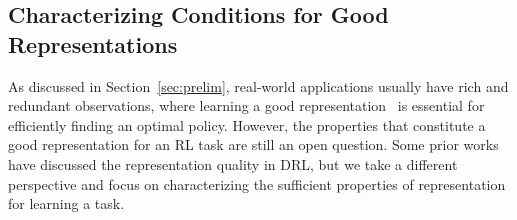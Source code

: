 
\subsection{Characterizing Conditions for Good Representations}
\label{sec:representation} 

As discussed in Section~\ref{sec:prelim}, real-world applications usually have rich and redundant observations, where learning a good representation~\citep{jaderberg2016reinforcement,dabney2020the} is essential for efficiently finding an optimal policy.
However, the properties that constitute a good representation for an RL task are still an open question.
Some prior works~\citep{bellemare2019geometric,dabney2020the,gelada2019deepmdp} have discussed the representation quality in DRL, but we take a different perspective and focus on characterizing the sufficient properties of representation for learning a task.

